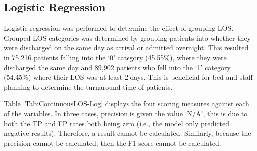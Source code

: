 \documentclass[../thesis.tex]{subfiles}
\begin{document}
\newpage
\subsection{Logistic Regression}\label{sec:logregresults}
Logistic regression was performed to determine the effect of grouping LOS. Grouped LOS categories was determined by grouping patients into whether they were discharged on the same day as arrival or admitted overnight. This resulted in 75,216 patients falling into the `0' category (45.55\%), where they were discharged the same day and 89,902 patients who fell into the `1' category (54.45\%) where their LOS was at least 2 days. This is beneficial for bed and staff planning to determine the turnaround time of patients. 

Table \ref{Tab:ContinuousLOS-Log} displays the four scoring measures against each of the variables. In three cases, precision is given the value `N/A', this is due to both the TP and FP rates both being zero (i.e., the model only predicted negative results). Therefore, a result cannot be calculated. Similarly, because the precision cannot be calculated, then the F1 score cannot be calculated.

\begin{table}[h!]
\centering{}
\caption{Logistic Regression Result}
\label{Tab:ContinuousLOS-Log}
\end{table}
\end{document}

